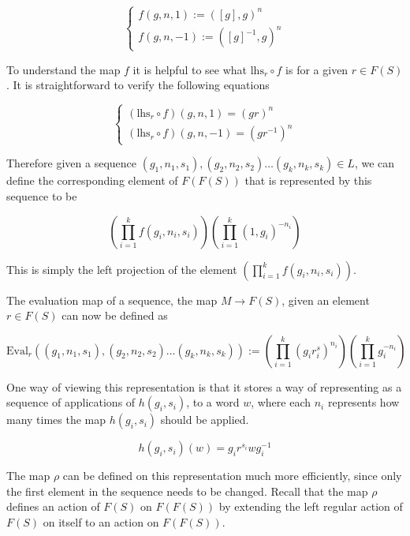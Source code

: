 \documentclass[12pt]{article} %
\theoremstyle{definition}
\theoremstyle{definition}
\theoremstyle{definition}
\theoremstyle{definition}
\begin{document}
\begin{equation}
  \begin{cases}
    f(g, n, 1) := ([g], g) ^ n \\
    f(g, n, -1) := ([g]^{-1}, g)^n
  \end{cases}
\end{equation}

To understand the map $f$ it is helpful to see what $\text{lhs}_r \circ f$ is for a given
$r \in F(S)$. It is straightforward to verify the following equations

\begin{equation}
  \begin{cases}
    (\text{lhs}_r \circ f)(g, n, 1) = (gr)^n \\
    (\text{lhs}_r \circ f)(g, n, -1) = (gr^{-1})^n
  \end{cases}
\end{equation}

Therefore given a sequence $(g_1, n_1, s_1), (g_2, n_2,s_2) \dots (g_k, n_k,s_k) \in L$,
we can define the corresponding element of $F(F(S))$ that is represented by this
sequence to be

\begin{equation}
    \left(\prod_{i=1}^k f(g_i, n_i, s_i)\right)\left(\prod_{i=1}^k (1, g_i)^{-n_i}\right)
\end{equation}

This is simply the left projection of the element $\left(\prod_{i=1}^k f(g_i, n_i, s_i)\right)$.

The evaluation map of a sequence, the map $M \to F(S)$, given an element $r \in F(S)$
can now be defined as

\begin{equation}
  \text{Eval}_r((g_1, n_1, s_1), (g_2, n_2,s_2) \dots (g_k, n_k,s_k)) :=
  \left(\prod_{i=1}^k (g_ir^s_i)^{n_i}\right)\left(\prod_{i=1}^k g_i^{-n_i}\right)
\end{equation}

One way of viewing this representation is that it stores a way of representing
as a sequence of applications of $h(g_i,s_i)$, to a word $w$, where each $n_i$
represents how many times the map $h(g_i, s_i)$ should be applied.

\begin{equation}
  h(g_i, s_i)(w) = g_ir^{s_i}wg_i^{-1}
\end{equation}

The map $\rho$ can be defined on this representation much more efficiently,
since only the first
element in the sequence needs to be changed. Recall that the map
$\rho$ defines an action of $F(S)$ on $F(F(S))$ by extending the left regular
action of $F(S)$ on itself to an action on $F(F(S))$.
\end{document}
